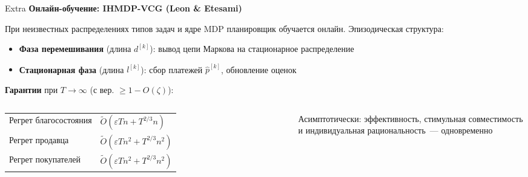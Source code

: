 \documentclass[aspectratio=169]{beamer}
\begin{document}
\begin{frame}{Extra}
        \textbf{Онлайн-обучение: IHMDP-VCG (Leon \& Etesami)}

        \vspace{0.15cm}
        При неизвестных распределениях типов задач и ядре MDP планировщик
        обучается онлайн. Эпизодическая структура:

        \begin{itemize}
                \item \textbf{Фаза перемешивания} (длина $d^{[k]}$):
                        вывод цепи Маркова на стационарное распределение
                \item \textbf{Стационарная фаза} (длина $l^{[k]}$):
                        сбор платежей $\hat{p}^{[k]}$, обновление оценок
        \end{itemize}

        \vspace{0.15cm}
        \textbf{Гарантии} при $T \to \infty$ (с вер. $\geq 1 - O(\zeta)$):

        \vspace{0.1cm}
        \begin{columns}
                \begin{tabular}{ll}
                        Регрет благосостояния &
                        $\tilde{O}(\varepsilon T n + T^{2/3} n)$ \\[3pt]
                        Регрет продавца &
                        $\tilde{O}(\varepsilon T n^2 + T^{2/3} n^2)$ \\[3pt]
                        Регрет покупателей &
                        $\tilde{O}(\varepsilon T n^2 + T^{2/3} n^2)$
                \end{tabular}

                \begin{shadowbox}
                        \footnotesize Асимптотически: эффективность,
                        стимульная совместимость и индивидуальная
                        рациональность~--- одновременно
                \end{shadowbox}
        \end{columns}
\end{frame}
\addtocounter{framenumber}{-1}
\end{document}
